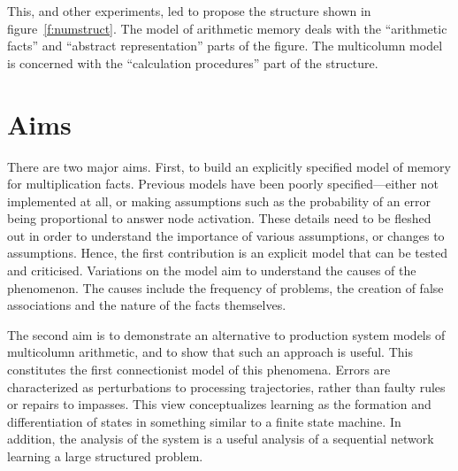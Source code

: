 This, and other experiments, led  to propose the structure
shown in figure~\ref{f:numstruct}.  The model of arithmetic memory deals
with the ``arithmetic facts'' and ``abstract representation'' parts of the
figure.  The multicolumn model is concerned with the ``calculation
procedures'' part of the structure.


\section{Aims}

There are two major aims. First, to build an explicitly specified model of
memory for multiplication facts.  Previous models have been poorly
specified---either not implemented at all, or making assumptions such as
the probability of an error being proportional to answer node activation.
These details need to be fleshed out in order to understand the importance
of various assumptions, or changes to assumptions.  Hence, the first
contribution is an explicit model that can be tested and criticised.
Variations on the model aim to understand the causes of the phenomenon.
The causes include the frequency of problems, the creation of false
associations and the nature of the facts themselves.

The second aim is to demonstrate
an alternative to production system models of
multicolumn arithmetic, and to show that such an approach is useful.  This
constitutes the first connectionist model of this phenomena. Errors are
characterized as perturbations to processing trajectories, rather than faulty
rules or repairs to impasses.  This view conceptualizes learning as the
formation and differentiation of states in something similar to a finite
state machine.
In addition, the analysis of the
system is a useful analysis of a sequential
network learning a large structured problem.
